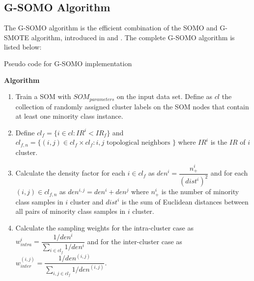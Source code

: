 \documentclass[parskip=full]{scrartcl}
\begin{document}
\subsection{G-SOMO Algorithm}

The G-SOMO algorithm is the efficient combination of the SOMO and G-SMOTE
algorithm, introduced in \cite{Douzas2017B} and \cite{Douzas2017}. The complete
G-SOMO algorithm is listed below:

\begin{algorithm}[H]

	\SetAlgoLined
	\caption{Pseudo code for G-SOMO implementation}
	
	\BlankLine
	
	

	\BlankLine

	\textbf{Algorithm}
	\SetAlgoLined

	\begin{enumerate}

		\item Train a SOM with $SOM_{parameters}$ on the input data set. Define
			  as $cl$ the collection of randomly assigned cluster labels on the
			  SOM nodes that contain at least one minority class instance.
	
		\item Define $cl_{f} =\{i \in cl: IR^{i} < IR_{f} \} $ and 	
			  $cl_{f, n} =\{(i, j) \in cl_{f} \times cl_{f}: i, j \text{ topological neighbors } \} $ 
			  where $IR^{i}$ is the $IR$ of  $i$ cluster.
	
		\item Calculate the density factor for each $i \in cl_{f}$  as $den^{i}
			  = \dfrac{n^{i}_{+}}{(dist^{i})^2}$ and for each $(i, j) \in cl_{f, n}$ 
			  as $den^{i, j} = den^{i} + den^{j}$ where $n^{i}_{+}$ is the
			  number of minority class samples in $i$ cluster and $dist^{i}$ is
			  the sum of Euclidean distances between all pairs  of minority
			  class samples in $i$ cluster.
	
		\item Calculate the sampling weights for the intra-cluster case as
			  $w^{i}_{intra} = \dfrac{1 / den^{i}}{\sum_{i \in cl_{f}} 1/den^{i}}$ and
			  for the inter-cluster case as 
			  $w^{(i, j)}_{inter} = \dfrac{1 / den^{(i, j)}}{\sum_{i,j \in cl_{f}} 1/den^{(i,j)}}$.
	

\end{enumerate}
\end{algorithm}
\end{document}
